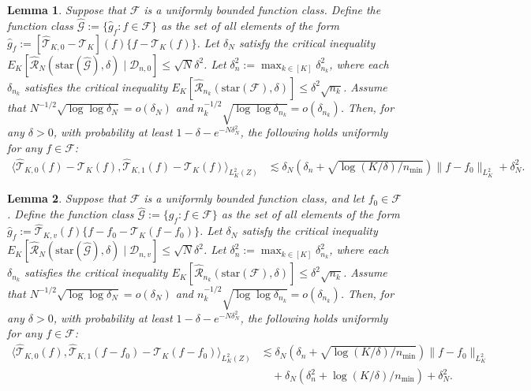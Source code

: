 \documentclass[11pt]{article}
\theoremstyle{plain}
\newtheorem{lemma}{Lemma}
\theoremstyle{definition}
\theoremstyle{remark}
\theoremstyle{definition}
\begin{document}
 \begin{lemma}
 \label{lemma::localmax_smalln_1}
    Suppose that $\mathcal{F}$ is a uniformly bounded function class. Define the function class $\widehat{\mathcal{G}} := \{\widehat{g}_f : f \in \mathcal{F}\}$ as the set of all elements of the form $ \widehat{g}_f :=[\widehat{\mathcal{T}}_{K,0} - \mathcal{T}_{K}](f) \{f - \mathcal{T}_{K}(f)\}$. Let $\delta_N$ satisfy the critical inequality $E_K[\widehat{\mathcal{R}}_N(\text{star}(\widehat{\mathcal{G}}), \delta) \mid \mathcal{D}_{n,0}] \leq \sqrt{N} \delta^2$. Let $\delta_n^2 := \max_{k \in [K]} \delta_{n_k}^2$, where each $\delta_{n_k}$ satisfies the critical inequality $E_K[\widehat{\mathcal{R}}_{n_k}(\text{star}(\mathcal{F}), \delta)] \leq \delta^2\sqrt{n_k}$. Assume that $ N^{-1/2} \sqrt{\log \log \delta_{N}} =  o(\delta_{N})$ and $ n_k^{-1/2} \sqrt{\log \log \delta_{n_k}} =  o(\delta_{n_k})$.  Then, for any $\delta > 0$, with probability at least $1- \delta - e^{-N\delta_N^2} $, the following holds uniformly for any $f \in \mathcal{F}$:
\begin{align*}
 \langle  \widehat{\mathcal{T}}_{K,0}(f) - \mathcal{T}_{K}(f), \widehat{\mathcal{T}}_{K,1}(f) - \mathcal{T}_{K}(f) \rangle_{L^2_K(Z)} &\lesssim \delta_N \left( \delta_n +  \sqrt{\log(K/\delta) / n_{\min}} \right) \|f - f_0\|_{L^2_K}   + \delta_N^2.
\end{align*} 
 \end{lemma}

 

 
   \begin{lemma}
  \label{lemma::localmax_smalln_2}
    Suppose that $\mathcal{F}$ is a uniformly bounded function class, and let $ f_0 \in \mathcal{F}$. Define the function class $\widehat{\mathcal{G}} := \{\widehat{g}_f : f \in \mathcal{F}\}$ as the set of all elements of the form $ \widehat{g}_f :=\widehat{\mathcal{T}}_{K,v}(f) \{f - f_0 - \mathcal{T}_{K}(f - f_0)\}$. Let $\delta_N$ satisfy the critical inequality $E_K[\widehat{\mathcal{R}}_N(\text{star}(\widehat{\mathcal{G}}), \delta) \mid \mathcal{D}_{n,v}] \leq \sqrt{N} \delta^2$. Let $\delta_n^2 := \max_{k \in [K]} \delta_{n_k}^2$, where each $\delta_{n_k}$ satisfies the critical inequality $E_K[\widehat{\mathcal{R}}_{n_k}(\text{star}(\mathcal{F}), \delta)] \leq \delta^2\sqrt{n_k}$.  Assume that $ N^{-1/2} \sqrt{\log \log \delta_{N}} =  o(\delta_{N})$ and $ n_k^{-1/2} \sqrt{\log \log \delta_{n_k}} =  o(\delta_{n_k})$.  Then, for any $\delta > 0$, with probability at least $1 -  \delta - e^{ -N\delta_N^2} $, the following holds uniformly for any $f \in \mathcal{F}$:
\begin{align*}
 \langle  \widehat{\mathcal{T}}_{K,0}(f), \widehat{\mathcal{T}}_{K,1}(f - f_0) - \mathcal{T}_{K}(f - f_0) \rangle_{L^2_K(Z)} &\lesssim \delta_N \left( \delta_n +  \sqrt{\log(K/\delta) / n_{\min}} \right) \|f - f_0\|_{L^2_K}  \\
 & \quad +   \delta_N \left( \delta_n^2 +  \log(K/\delta) / n_{\min} \right)    + \delta_N^2.
\end{align*} 
 \end{lemma}
\end{document}
